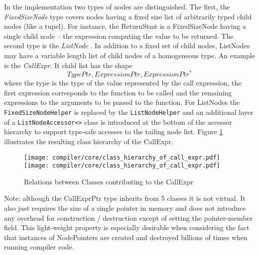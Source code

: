 In the implementation two types of nodes are distinguished. The first, the
\textit{FixedSizeNode}  type covers nodes having a fixed
size list of arbitrarily typed child nodes (like a tupel). For instance, the
ReturnStmt is a FixedSizeNode having a single child node -- the expression
computing the value to be returned. The second type is the \textit{ListNode}
.
In addition to a fixed set of child nodes, ListNodes may have a variable length list
of child nodes of a homogeneous type. An example is the \textit{CallExpr}. It
child list has the shape
$$TypePtr, ExpressionPtr, ExpressionPtr^*$$
where the type is the type of the value represented by the call expression, the
first expression corresponds to the function to be called and the remaining
expressions to the arguments to be passed to the function. For ListNodes the
\lstinline|FixedSizeNodeHelper| is replaced by the \lstinline|ListNodeHelper|
and an additional layer of a \lstinline|ListNodeAccessor<>| class is introduced
at the bottom of the accessor hierarchy to support type-safe accesses to the
tailing node list. Figure \ref{fig:Compiler.Core.Classes.CallExpr} illustrates
the resulting class hierarchy of the CallExpr.
\begin{figure}[!tb]
	\centering
	\texttt{[image: compiler/core/class\_hierarchy\_of\_call\_expr.pdf]}
	\texttt{[image: compiler/core/class\_hierarchy\_of\_call\_expr.pdf]}
	\caption{Relations between Classes contributing to the CallExpr}
	\label{fig:Compiler.Core.Classes.CallExpr}
\end{figure}
Note: although the CallExprPtr type inherits from 5 classes it is not virtual.
It also just requires the size of a single pointer in memory and does not
introduce any overhead for construction / destruction except of setting the
pointer-member field. This light-weight property is especially desirable
when considering the fact that instances of NodePointers are created and
destroyed billions of times when running compiler code.

